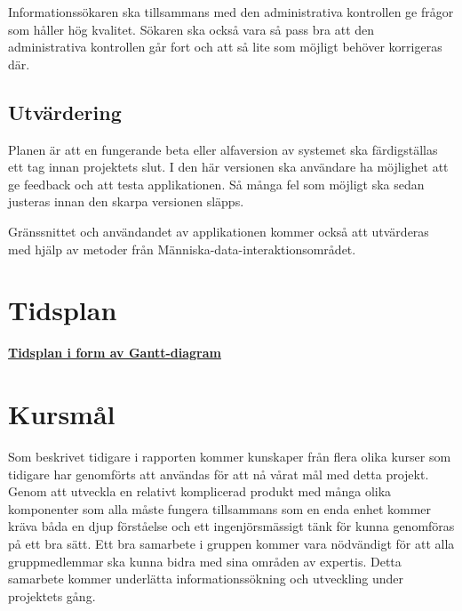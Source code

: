 \documentclass[swedish,12pt,a4paper]{article}
\begin{document}
Informationssökaren ska tillsammans med den administrativa kontrollen ge frågor som håller hög kvalitet. Sökaren ska också vara så pass bra att den administrativa kontrollen går fort och att så lite som möjligt behöver korrigeras där.
\subsection{Utvärdering}
Planen är att en fungerande beta eller alfaversion av systemet ska färdigställas ett tag innan projektets slut. I den här versionen ska användare ha möjlighet att ge feedback och att testa applikationen. Så många fel som möjligt ska sedan justeras innan den skarpa versionen släpps.

Gränssnittet och användandet av applikationen kommer också att utvärderas med hjälp av metoder från Människa-data-interaktionsområdet.
\appendix
\section{Tidsplan}

\textbf{\href{http://www.gantt-chart.com//?td=550c7506aa5a1dd480bd4c8d-845131}{Tidsplan i form av Gantt-diagram}}\\

\section{Kursmål}

Som beskrivet tidigare i rapporten kommer kunskaper från flera olika kurser som tidigare har genomförts att användas för att nå vårat mål med detta projekt. Genom att utveckla en relativt komplicerad produkt med många olika komponenter som alla måste fungera tillsammans som en enda enhet kommer kräva båda en djup förståelse och ett ingenjörsmässigt tänk för kunna genomföras på ett bra sätt.
Ett bra samarbete i gruppen kommer vara nödvändigt för att alla gruppmedlemmar ska kunna bidra med sina områden av expertis. Detta samarbete kommer underlätta informationssökning och utveckling under projektets gång.\\
\end{document}
